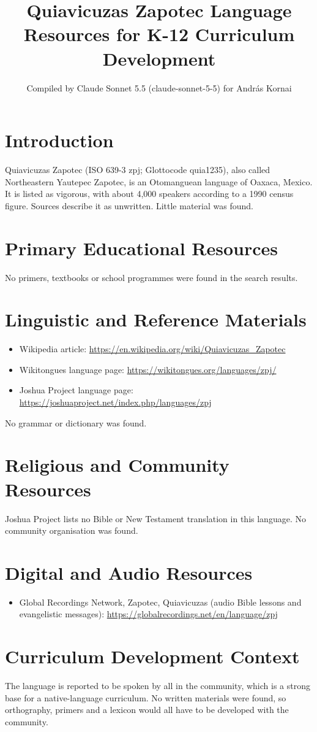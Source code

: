 \documentclass[12pt]{article}
\title{Quiavicuzas Zapotec Language Resources for K-12 Curriculum Development}
\author{Compiled by Claude Sonnet 5.5 (claude-sonnet-5-5) for Andr\'as Kornai}
\date{}
\begin{document}
\maketitle

\section{Introduction}
Quiavicuzas Zapotec (ISO 639-3 zpj; Glottocode quia1235), also called Northeastern Yautepec Zapotec, is an Otomanguean language of Oaxaca, Mexico. It is listed as vigorous, with about 4,000 speakers according to a 1990 census figure. Sources describe it as unwritten. Little material was found.

\section{Primary Educational Resources}
No primers, textbooks or school programmes were found in the search results.

\section{Linguistic and Reference Materials}
\begin{itemize}
\item Wikipedia article: \url{https://en.wikipedia.org/wiki/Quiavicuzas_Zapotec}
\item Wikitongues language page: \url{https://wikitongues.org/languages/zpj/}
\item Joshua Project language page: \url{https://joshuaproject.net/index.php/languages/zpj}
\end{itemize}
No grammar or dictionary was found.

\section{Religious and Community Resources}
Joshua Project lists no Bible or New Testament translation in this language. No community organisation was found.

\section{Digital and Audio Resources}
\begin{itemize}
\item Global Recordings Network, Zapotec, Quiavicuzas (audio Bible lessons and evangelistic messages): \url{https://globalrecordings.net/en/language/zpj}
\end{itemize}

\section{Curriculum Development Context}
The language is reported to be spoken by all in the community, which is a strong base for a native-language curriculum. No written materials were found, so orthography, primers and a lexicon would all have to be developed with the community.
\end{document}
